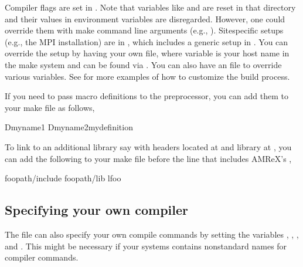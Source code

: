 \documentclass[letterpaper,10pt,english]{sphinxmanual}
\begin{document}
\sphinxAtStartPar
Compiler flags are set in . Note that variables
like  and  are reset in that directory and their values in
environment variables are disregarded.  However, one could override them
with make command line arguments (e.g., ).
Site\sphinxhyphen{}specific setups (e.g., the MPI
installation) are in , which includes a generic
setup in . You can override the setup by having your own
 file, where variable  is your host
name in the make system and can be found via .  You can
also have an  file to override various
variables. See  for more examples of
how to customize the build process.

\sphinxAtStartPar
If you need to pass macro definitions to the preprocessor, you can add
them to your make file as follows,

\begin{sphinxVerbatim}[commandchars=\\\{\}]
  \PYGZhy{}Dmyname1 \PYGZhy{}Dmyname2mydefinition
\end{sphinxVerbatim}

\sphinxAtStartPar
To link to an additional library say  with headers located at
 and library at , you can add the
following to your make file before the line that includes AMReX’s
,

\begin{sphinxVerbatim}[commandchars=\\\{\}]
  foopath/include
  foopath/lib
  \PYGZhy{}lfoo
\end{sphinxVerbatim}


\subsection{Specifying your own compiler}
\label{\detokenize{BuildingAMReX:specifying-your-own-compiler}}\label{\detokenize{BuildingAMReX:sec-build-local}}
\sphinxAtStartPar
The  file can also specify your own compile
commands by setting the variables , , , and . This
might be necessary if your systems contains non\sphinxhyphen{}standard names for compiler
commands.
\end{document}
